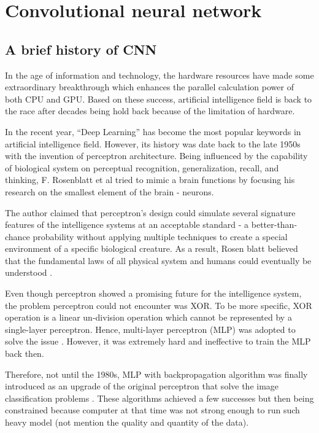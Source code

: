 	
	

\section{Convolutional neural network}
\subsection{A brief history of CNN}
\label{subsection:CNNhistory}
\noindent

	In the age of information and technology, the hardware resources have made some extraordinary breakthrough which enhances the parallel calculation power of both CPU and GPU. Based on these success, artificial intelligence field is back to the race after decades being hold back because of the limitation of hardware.

	In the recent year, “Deep Learning” has become the most popular keywords in artificial intelligence field. However, its history was date back to the late 1950s with the invention of perceptron architecture. Being influenced by the capability of biological system on perceptual recognition, generalization, recall, and thinking, F. Rosenblatt et al tried to mimic a brain functions by focusing his research on the smallest element of the brain - neurons. 
	
	The author claimed that perceptron’s design could simulate several signature features of the intelligence systems at an acceptable standard - a better-than-chance probability without applying multiple techniques to create a special environment of a specific biological creature. As a result, Rosen blatt believed that the fundamental laws of all physical system and humans could eventually be understood \cite{perceptron}.
	
	Even though perceptron showed a promising future for the intelligence system, the problem perceptron could not encounter was XOR. To be more specific, XOR operation is a linear un-division operation which cannot be represented by a single-layer perceptron. Hence, multi-layer perceptron (MLP) was adopted to solve the issue \cite{xorproblem}. However, it was extremely hard and ineffective to train the MLP back then.
	
	Therefore, not until the 1980s, MLP with backpropagation algorithm was finally introduced as an upgrade of the original perceptron that solve the image classification problems \cite{backpropagation}. These algorithms achieved a few successes but then being constrained because computer at that time was not strong enough to run such heavy model (not mention the quality and quantity of the data). 
	
